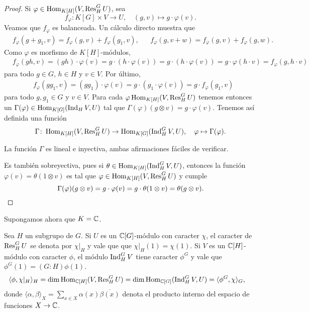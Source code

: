 \begin{proof}
Si $\varphi\in\operatorname{Hom}_{K[H]}(V,\operatorname{Res}_H^GU)$, sea 
\[
f_{\varphi}\colon K[G]\times V\to U,
\quad
(g,v)\mapsto g\cdot\varphi(v).
\]
Veamos que $f_{\varphi}$ es balanceada. Un cálculo directo muestra que
\begin{align*}
    &f_{\varphi}(g+g_1,v)=f_{\varphi}(g,v)+f_{\varphi}(g_1,v),&&
    f_{\varphi}(g,v+w)=f_{\varphi}(g,v)+f_{\varphi}(g,w).
\end{align*}
Como $\varphi$ es morfismo de $K[H]$-módulos,
\begin{align*}
    &f_{\varphi}(gh,v)=(gh)\cdot\varphi(v)
    =g\cdot (h\cdot \varphi(v))
    =g\cdot (h\cdot\varphi(v))
    =g\cdot \varphi(h\cdot v)=f_{\varphi}(g,h\cdot v)
\end{align*}
para todo $g\in G$, $h\in H$ y $v\in V$. Por último,
\begin{align*}
    &f_{\varphi}(gg_1,v)=(gg_1)\cdot\varphi(v)=g\cdot(g_1\cdot\varphi(v))=g\cdot f_{\varphi}(g_1,v)
\end{align*}
para todo $g,g_1\in G$ y $v\in V$. Para cada $\varphi\operatorname{Hom}_{K[H]}(V,\operatorname{Res}_H^GU)$ tenemos 
entonces un $\Gamma(\varphi)\in\operatorname{Hom}_{K[G]}(\operatorname{Ind}_HV,U)$ tal que
$\Gamma(\varphi)(g\otimes v)=g\cdot\varphi(v)$. 
Tenemos así definida una función 
\[
\Gamma\colon \operatorname{Hom}_{K[H]}(V,\operatorname{Res}_H^GU)\to\operatorname{Hom}_{K[G]}(\operatorname{Ind}_H^GV,U),
\quad
\varphi\mapsto\Gamma(\varphi).
\]

La función $\Gamma$ es lineal e inyectiva, ambas afirmaciones fáciles de verificar. 

Es también sobreyectiva, pues si $\theta\in\operatorname{Hom}_{K[H]}(\operatorname{Ind}_H^GV,U)$, entonces
la función $\varphi(v)=\theta(1\otimes v)$ es tal que $\varphi\in\operatorname{Hom}_{K[H]}(V,\operatorname{Res}_H^GU)$ y 
cumple 
\[
\Gamma(\varphi)(g\otimes v)=g\cdot\varphi(v)=g\cdot\theta(1\otimes v)=\theta(g\otimes v).\qedhere
\]
\end{proof}

Supongamos ahora que $K=\mathbb{C}$. 

Sea $H$ un subgrupo de $G$. Si $U$ es un $\mathbb{C}[G]$-módulo con caracter $\chi$, el caracter de $\operatorname{Res}_H^GU$ se denota por $\chi|_H$ y vale que 
que $\chi|_H(1)=\chi(1)$. Si $V$ es un $\mathbb{C}[H]$-módulo con 
caracter $\phi$, el módulo $\operatorname{Ind}_H^GV$ tiene caracter $\phi^G$ y vale que $\phi^G(1)=(G:H)\phi(1)$. 
\begin{align*}
\langle \phi,\chi|_H\rangle_H 
&=\dim\operatorname{Hom}_{\mathbb{C}[H]}(V,\operatorname{Res}_H^GU)
=\dim\operatorname{Hom}_{\mathbb{C}[G]}(\operatorname{Ind}_H^GV,U)
=\langle\phi^G,\chi\rangle_G,
\end{align*}
donde $\langle \alpha,\beta\rangle_X=\sum_{x\in X}\alpha(x)\overline{\beta(x)}$ denota el producto 
interno del espacio de funciones $X\to\mathbb{C}$. 

